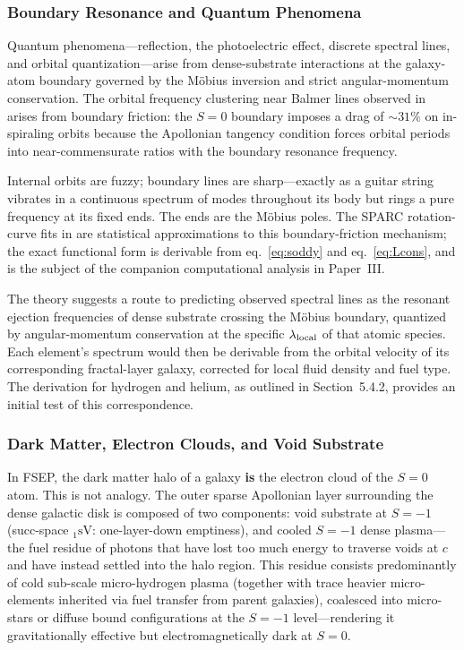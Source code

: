 \documentclass[11pt,letterpaper]{article}
\newcommand{\Sd}[2]{{}_{#1}\mathrm{s}\mathrm{#2}}
\begin{document}
\subsubsection{Boundary Resonance and Quantum Phenomena}
\label{sec:boundary_resonance}
Quantum phenomena---reflection, the photoelectric effect, discrete spectral lines,
and orbital quantization---arise from dense-substrate interactions at the
galaxy-atom boundary governed by the M\"obius inversion and strict
angular-momentum conservation. The orbital frequency clustering near Balmer lines
observed in \cite{FSEP-I} arises from boundary friction: the $S{=}0$ boundary
imposes a drag of $\sim 31\%$ on in-spiraling orbits because the Apollonian
tangency condition forces orbital periods into near-commensurate ratios with the
boundary resonance frequency.

Internal orbits are fuzzy; boundary lines are sharp---exactly as a guitar string
vibrates in a continuous spectrum of modes throughout its body but rings a pure
frequency at its fixed ends. The ends are the M\"obius poles. The SPARC
rotation-curve fits in \cite{FSEP-I} are statistical approximations to this
boundary-friction mechanism; the exact functional form is derivable from
eq.~\eqref{eq:soddy} and eq.~\eqref{eq:Lcons}, and is the subject of the companion
computational analysis in Paper~III.

The theory suggests a route to predicting observed spectral lines as the resonant
ejection frequencies of dense substrate crossing the M\"obius boundary, quantized
by angular-momentum conservation at the specific $\lambda_{\rm local}$ of that
atomic species. Each element's spectrum would then be derivable from the orbital
velocity of its corresponding fractal-layer galaxy, corrected for local fluid
density and fuel type. The derivation for hydrogen and helium, as outlined in
\cite{FSEP-I} Section~5.4.2, provides an initial test of this correspondence.

\subsubsection{Dark Matter, Electron Clouds, and Void Substrate}
\label{sec:darkmatter}
In FSEP, the dark matter halo of a galaxy \textbf{is} the electron cloud of the
$S{=}0$ atom. This is not analogy. The outer sparse Apollonian layer surrounding
the dense galactic disk is composed of two components: void substrate at $S{=}{-1}$
(succ-space $\Sd{1}{V}$: one-layer-down emptiness), and cooled $S{=}{-1}$ dense
plasma---the fuel residue of photons that have lost too much energy to traverse
voids at $c$ and have instead settled into the halo region. This residue consists
predominantly of cold sub-scale micro-hydrogen plasma (together with trace heavier
micro-elements inherited via fuel transfer from parent galaxies), coalesced into
micro-stars or diffuse bound configurations at the $S{=}{-1}$ level---rendering it
gravitationally effective but electromagnetically dark at $S{=}0$.
\end{document}
